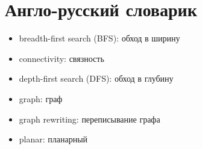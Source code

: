 
\chapter{Англо-русский словарик}

\begin{itemize}
	\item breadth-first search (BFS): обход в ширину
	\item connectivity: связность
	\item depth-first search (DFS): обход в глубину
	\item graph: граф
	\item graph rewriting: переписывание графа
	\item planar: планарный
\end{itemize}
